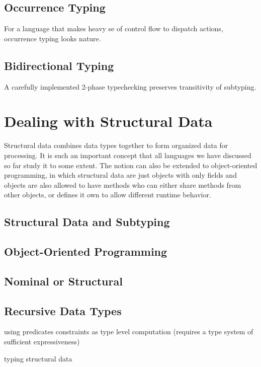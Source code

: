 \subsection{Occurrence Typing}

For a language that makes heavy  se of control flow to dispatch actions,
occurrence typing looks nature.

\subsection{Bidirectional Typing}

A carefully implemented 2-phase typechecking preserves transitivity of subtyping.

\section{Dealing with Structural Data}

Structural data combines data types together to form organized data for processing.
It is such an important concept that all languages we have discussed so far study
it to some extent. The notion can also be extended to object-oriented programming,
in which structural data are just objects with only fields and objects are also
allowed to have methods who can either share methods from other objects,
or defines it own to allow different runtime behavior.

\subsection{Structural Data and Subtyping}

\subsection{Object-Oriented Programming}

\subsection{Nominal or Structural}

\subsection{Recursive Data Types}

using predicates
constraints as type level computation (requires a type system of sufficient expressiveness)

typing structural data


